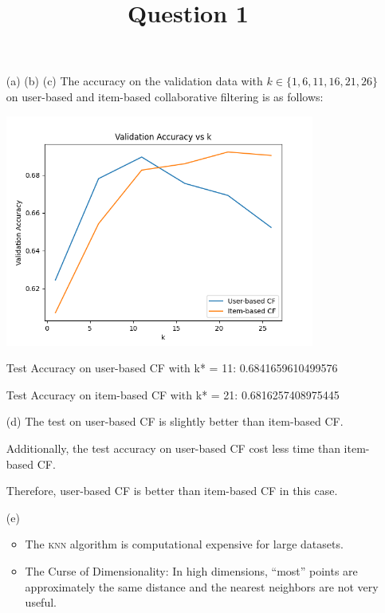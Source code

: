 \documentclass{article}
\title{Question 1}
\date{\vspace{-7.5ex}}
\begin{document}
\maketitle
\thispagestyle{fancy}

\begin{enumerate}
    \item [(a) (b) (c)] The accuracy on the validation data with $k \in \{1, 6, 11, 16, 21, 26\}$ on user-based and item-based collaborative filtering is as follows:
    \begin{center}
        \includegraphics[width=0.8\textwidth]{q1.png}
    \end{center}
    Test Accuracy on user-based CF with k* = 11: 0.6841659610499576

    Test Accuracy on item-based CF with k* = 21: 0.6816257408975445

    \item [(d)] The test on user-based CF is slightly better than item-based CF.
    
    Additionally, the test accuracy on user-based CF cost less time than item-based CF.

    Therefore, user-based CF is better than item-based CF in this case.

    \item [(e)] 
    \begin{itemize}
        \item The \textsc{knn} algorithm is computational expensive for large datasets.
        \item The Curse of Dimensionality: In high dimensions, ``most'' points are approximately the same distance and the nearest neighbors are not very useful.
    \end{itemize}
\end{enumerate}
\end{document}
